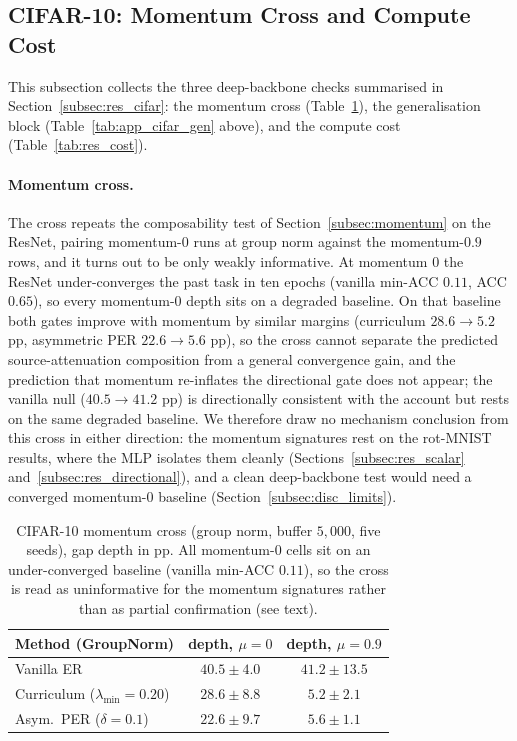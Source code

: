 \subsection{CIFAR-10: Momentum Cross and Compute Cost}
\label{app:cifar_extra}

This subsection collects the three deep-backbone checks summarised in Section~\ref{subsec:res_cifar}: the momentum cross (Table~\ref{tab:res_cifar_mom}), the generalisation block (Table~\ref{tab:app_cifar_gen} above), and the compute cost (Table~\ref{tab:res_cost}).

\paragraph{Momentum cross.} The cross repeats the composability test of Section~\ref{subsec:momentum} on the ResNet, pairing momentum-$0$ runs at group norm against the momentum-$0.9$ rows, and it turns out to be only weakly informative. At momentum $0$ the ResNet under-converges the past task in ten epochs (vanilla min-ACC $0.11$, ACC $0.65$), so every momentum-$0$ depth sits on a degraded baseline. On that baseline both gates improve with momentum by similar margins (curriculum $28.6 \rightarrow 5.2$ pp, asymmetric PER $22.6 \rightarrow 5.6$ pp), so the cross cannot separate the predicted source-attenuation composition from a general convergence gain, and the prediction that momentum re-inflates the directional gate does not appear; the vanilla null ($40.5 \rightarrow 41.2$ pp) is directionally consistent with the account but rests on the same degraded baseline. We therefore draw no mechanism conclusion from this cross in either direction: the momentum signatures rest on the rot-MNIST results, where the MLP isolates them cleanly (Sections~\ref{subsec:res_scalar} and~\ref{subsec:res_directional}), and a clean deep-backbone test would need a converged momentum-$0$ baseline (Section~\ref{subsec:disc_limits}).

\begin{table}[H]
    \centering
    \small
    \begin{tabular}{l cc}
        \hline
        Method (GroupNorm)                   & depth, $\mu{=}0$ & depth, $\mu{=}0.9$ \\
        \hline
        Vanilla ER                           & $40.5 \pm 4.0$   & $41.2 \pm 13.5$    \\
        Curriculum ($\lambda_{\min}{=}0.20$) & $28.6 \pm 8.8$   & $5.2 \pm 2.1$      \\
        Asym.\ PER ($\delta{=}0.1$)          & $22.6 \pm 9.7$   & $5.6 \pm 1.1$      \\
        \hline
    \end{tabular}
    \caption{CIFAR-10 momentum cross (group norm, buffer $5{,}000$, five seeds), gap depth in pp. All momentum-$0$ cells sit on an under-converged baseline (vanilla min-ACC $0.11$), so the cross is read as uninformative for the momentum signatures rather than as partial confirmation (see text).}
    \label{tab:res_cifar_mom}
\end{table}

